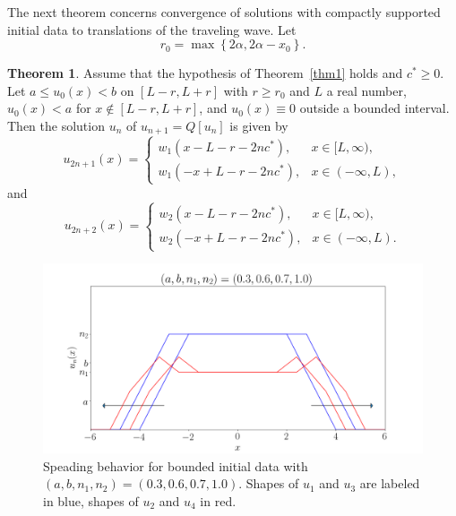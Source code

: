 \documentclass[11pt]{article}
\numberwithin{equation}{section}
\theoremstyle{definition}
\newtheorem{theorem}{Theorem}[section]
\begin{document}
The next theorem concerns convergence of solutions with compactly supported initial data to translations of the traveling wave. Let
\begin{equation}
r_0 = \max\left\{2\alpha,2\alpha-x_0\right\}.
\end{equation}
\begin{theorem} Assume that the hypothesis of Theorem~\ref{thm1} holds and $c^*\geq0$.  Let $a\leq  u_0(x)<b $ on $[L-r, L+r]$ with $r\geq r_0$ and $L$ a real number, $u_0(x)<a$  for $x\not\in [L-r, L+r]$, and $u_0(x)\equiv 0$ outside a bounded interval.  
Then the solution $u_n$ of $u_{n+1}=Q[u_n]$ is given by
\begin{equation}
u_{2n+1}(x) = \begin{cases}
w_1(x-L-r-2nc^*), & x\in[L,\infty), \\
w_1(-x+L-r-2nc^*), & x\in(-\infty,L),
\end{cases}
\end{equation}
and
\begin{equation}
u_{2n+2}(x) = \begin{cases}
w_2(x-L-r-2nc^*),  & x\in[L,\infty), \\
w_2(-x+L-r-2nc^*), & x\in(-\infty,L).
\end{cases}
\end{equation}
\end{theorem}


\begin{figure} \label{fig5}
    \centering
    \includegraphics[scale=0.25]{fig5}
    \caption{Speading behavior for bounded initial data with $(a,b,n_1,n_2)=(0.3,0.6,0.7,1.0)$. Shapes of $u_1$ and $u_3$ are labeled in blue, shapes of $u_2$ and $u_4$ in red.}
\label{fig:spread}
\end{figure}
\end{document}

